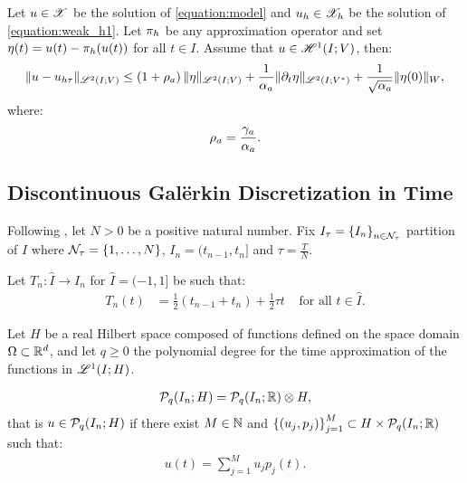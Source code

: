 \begin{theorem} \label{theorem:estimate_h}
    Let $u \in \mathscr{X}$ be the solution of \cref{equation:model} and $u_h \in \mathscr{X}_h$ be the solution of \cref{equation:weak_h1}. Let $\pi_h$ be any approximation operator and set $\eta(t) = u(t) - \pi_h(u(t))$ for all $t \in I$. Assume that $u \in \mathscr{H}^{1}(I; V)$, then:
    \begin{align}
        \lVert u - u_{h \tau} \rVert_{\mathscr{L}^{2}(I; V)} \leq \left( 1 + \rho_{a} \right) \lVert \eta \rVert_{\mathscr{L}^{2}(I; V)} + \frac{1}{\alpha_{a}} \lVert \partial_t \eta \rVert_{\mathscr{L}^{2}(I; V^*)} + \frac{1}{\sqrt{\alpha_{a}}} \lVert \eta(0) \rVert_W,
    \end{align}
    where:
    \begin{align}
        \rho_{a} = \frac{\gamma_{a}}{\alpha_{a}}.
    \end{align}
\end{theorem}

\newpage
\subsection{Discontinuous Galërkin Discretization in Time} \label{subsection:time_dg}

Following \cite[p.~177]{Ern2021}, let $N > 0$ be a positive natural number. Fix $I_{\tau} = \left\{ I_n \right\}_{n \in \mathcal{N}_{\tau}}$ partition of $I$ where $\mathcal{N}_{\tau} = \left\{ 1, \dots, N \right\}$, $I_n = (t_{n - 1}, t_n]$ and $\tau = \frac{T}{N}$.

\begin{definition}[Mapping]
    Let $T_n \colon \hat{I} \rightarrow I_n$ for $\hat{I} = (-1, 1]$ be such that:
    \begin{align}
        T_n(t) &= \frac{1}{2}(t_{n - 1} + t_n) + \frac{1}{2} \tau t &\text{ for all } t \in \hat{I}.
    \end{align}
\end{definition}

Let $H$ be a real Hilbert space composed of functions defined on the space domain $\Omega \subset \mathbb{R}^{d}$, and let $q \geq 0$ the polynomial degree for the time approximation of the functions in $\mathscr{L}^{1}(I; H)$.

\begin{definition}[$\SpacePolynomials{q}(I_n; H)$]
    \begin{align}
        \mathcal{P}_{q}(I_n; H) = \mathcal{P}_{q}(I_n; \mathbb{R}) \otimes H,
    \end{align}
    that is $u \in \mathcal{P}_{q}(I_n; H)$ if there exist $M \in \mathbb{N}$ and $\left\{ (u_j, p_j) \right\}_{j = 1}^M \subset H \times \mathcal{P}_{q}(I_n; \mathbb{R})$ such that:
    \begin{align}
        u(t) = \sum_{j = 1}^M u_j p_j(t).
    \end{align}
\end{definition}

